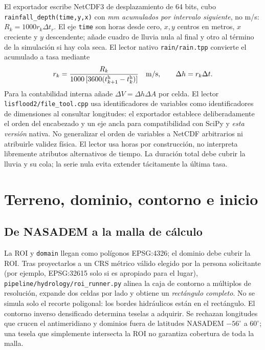 \documentclass[11pt,a4paper]{article}
\newcommand{\src}[1]{\nolinkurl{#1}}
\newcommand{\unit}[1]{\mathrm{#1}}
\begin{document}
El exportador escribe NetCDF3 de desplazamiento de 64 bits, cubo \texttt{rainfall\_depth(time,y,x)} con \emph{mm acumulados por intervalo siguiente}, no m/s: $R_k=1000r_k\Delta t_r$. El eje \texttt{time} son horas desde cero, $x,y$ centros en metros, $x$ creciente y $y$ descendente; añade cuadro de lluvia nula al final y otro al término de la simulación si hay cola seca. El lector nativo \src{rain/rain.tpp} convierte el acumulado a tasa mediante
\begin{equation}
 r_k=\frac{R_k}{1000\,[3600(t_{k+1}^{\rm h}-t_k^{\rm h})]}\quad\unit{m/s},
 \qquad \Delta h=r_k\Delta t.\label{eq:ncrain}
\end{equation}
Para la contabilidad interna añade $\Delta V=\Delta h\Delta A$ por celda. El lector \src{lisflood2/file_tool.cpp} usa identificadores de variables como identificadores de dimensiones al consultar longitudes: el exportador establece deliberadamente el orden del encabezado y un eje ancla para compatibilidad con SciPy y \emph{esta versión} nativa. No generalizar el orden de variables a NetCDF arbitrarios ni atribuirle validez física. El lector usa horas por construcción, no interpreta libremente atributos alternativos de tiempo. La duración total debe cubrir la lluvia y su cola; la serie nula evita extender tácitamente la última tasa.

\section{Terreno, dominio, contorno e inicio}
\label{sec:entradas}
\subsection{De NASADEM a la malla de cálculo}
La ROI y \texttt{domain} llegan como polígonos EPSG:4326; el dominio debe cubrir la ROI. Tras proyectarlos a un CRS métrico válido elegido por la persona solicitante (por ejemplo, EPSG:32615 solo si es apropiado para el lugar), \src{pipeline/hydrology/roi_runner.py} alinea la caja de contorno a múltiplos de resolución, expande dos celdas por lado y obtiene un \emph{rectángulo completo}. No se simula solo el recorte poligonal: los bordes hidráulicos están en el rectángulo. El contorno inverso densificado determina teselas a adquirir. Se rechazan longitudes que crucen el antimeridiano y dominios fuera de latitudes NASADEM $-56^\circ$ a $60^\circ$; una tesela que simplemente intersecta la ROI no garantiza cobertura de toda la malla.
\end{document}
